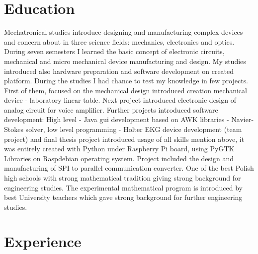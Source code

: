 \documentclass[8pt,a4paper]{moderncv}
\begin{document}
\maketitle

\section{Education}
\vspace{4mm}
\cvline{}{}
Mechatronical studies introduce designing and manufacturing complex devices and concern about in three science fields: mechanics, electronics and optics.
During seven semesters I learned the basic concept of electronic circuits, mechanical and micro mechanical device manufacturing and design.
My studies introduced also hardware preparation and software development on created platform.
During the studies I had chance to test my knowledge in few projects. First of them, focused on the
mechanical design introduced creation mechanical device - laboratory linear table. Next project introduced electronic design of analog circuit for voice amplifier.
Further projects introduced software development: High level - Java gui development based on AWK libraries - Navier-Stokes solver, low level programming - Holter EKG device development (team project) and 
final thesis project introduced usage of all skills mention above, it was entirely created with Python under Raspberry Pi board, using PyGTK Libraries on Raspdebian operating system.
Project included the design and manufacturing of SPI to parallel communication converter.
\cvline{}{}
\cvline{}{}
\vspace{4mm}
\cvline{}{}
One of the best Polish high schools with strong mathematical tradition giving strong background for engineering studies.
The experimental mathematical program is introduced by best University teachers which gave strong background for further engineering studies.
\cvline{}{}

\section{Experience}
\end{document}
